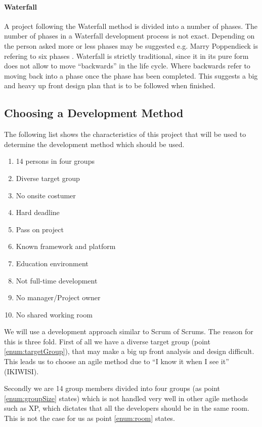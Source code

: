 \paragraph{Waterfall}
A project following the Waterfall method is divided into a number of phases.
The number of phases in a Waterfall development process is not exact.
Depending on the person asked more or less phases may be suggested e.g. Marry Poppendieck is refering to six phases \cite{Poppendieck00}.
Waterfall is strictly traditional, since it in its pure form does not allow to move ``backwards'' in the life cycle.
Where backwards refer to moving back into a phase once the phase has been completed.
This suggests a big and heavy up front design plan that is to be followed when finished.

\subsection{Choosing a Development Method}
The following list shows the characteristics of this project that will be used to determine the development method which should be used.
\begin{enumerate}
	\item 14 persons in four groups \label{enum:groupSize}
	\item Diverse target group \label{enum:targetGroup}
	\item No onsite costumer \label{enum:onsite}
	\item Hard deadline \label{enum:deadline}
	\item Pass on project \label{enum:passed}
	\item Known framework and platform \label{enum:framework}
	\item Education environment \label{enum:education}
	\item Not full-time development \label{enum:halftime}
	\item No manager/Project owner \label{enum:manager}
	\item No shared working room \label{enum:room}
\end{enumerate}
We will use a development approach similar to Scrum of Scrums.
The reason for this is three fold.
First of all we have a diverse target group (point \ref{enum:targetGroup}), that may make a big up front analysis and design difficult.
This leads us to choose an agile method due to ``I know it when I see it'' (IKIWISI).

Secondly we are 14 group members divided into four groups (as point \ref{enum:groupSize} states) which is not handled very well in other agile methods such as XP, which dictates that all the developers should be in the same room. 
This is not the case for us as point \ref{enum:room} states.

